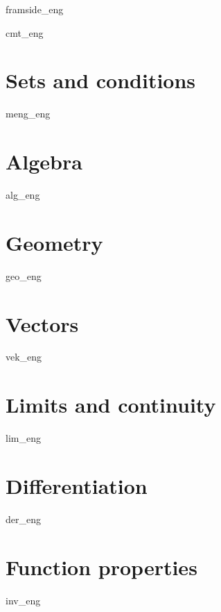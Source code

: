 



\usepackage[angle=0, scale=0.05, color={[rgb]{1,0,0}}, vpos = 20pt]{draftwatermark}



	
	{framside_eng}
	
	{\footnotesize \tableofcontents}
	\newpage
	
	{cmt_eng}
	
	\chapter{Sets and conditions} \label{Meng}
	\newpage
	{meng_eng}
	
	\chapter{Algebra} \label{Alg}
	\newpage
	{alg_eng} 
	
	\chapter{Geometry} \label{Geo}
	\newpage
	{geo_eng}
	
	\chapter{Vectors} \label{Vek}
	\newpage
	{vek_eng}
		
	\chapter{Limits and continuity} \label{Lim}
	\newpage
	{lim_eng}	

	\chapter{Differentiation} \label{Derivasjon} \label{Der}
	\newpage
	{der_eng}
	
	\chapter{Function properties} \label{Funk}
	\newpage
	{inv_eng}

